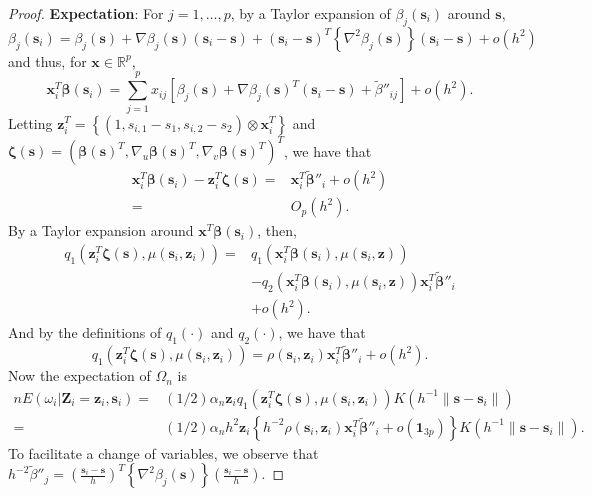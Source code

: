 \documentclass[authoryear,review, 12pt]{elsarticle}
\begin{document}
\begin{proof}
\textbf{Expectation}: For $j=1,\dots,p$, by a Taylor expansion of
$\beta_{j}(\bm{s}_{i})$ around $\bm{s}$,
\[
\beta_{j}(\bm{s}_{i})=\beta_{j}(\bm{s})+\nabla\beta_{j}(\bm{s})(\bm{s}_{i}-\bm{s})+(\bm{s}_{i}-\bm{s})^{T}\left\{ \nabla^{2}\beta_{j}(\bm{s})\right\} (\bm{s}_{i}-\bm{s})+o\left(h^{2}\right)
\]
and thus, for $\bm{x}\in\mathbb{R}^{p}$, 
\[
\bm{x}_{i}^{T}\bm{\beta}\!\left(\bm{s}_{i}\right)=\sum_{j=1}^{p}x_{ij}\left[\beta_{j}(\bm{s})+\nabla\beta_{j}(\bm{s})^{T}(\bm{s}_{i}-\bm{s})+\tilde{\beta}''_{ij}\right]+o\left(h^{2}\right).
\]
Letting $\bm{z}_{i}^{T}=\left\{ \left(1,s_{i,1}-s_{1},s_{i,2}-s_{2}\right)\otimes\bm{x}_{i}^{T}\right\} $
and $\bm{\zeta}(\bm{s})=\left(\bm{\beta}(\bm{s})^{T},\nabla_{u}\bm{\beta}(\bm{s})^{T},\nabla_{v}\bm{\beta}(\bm{s})^{T}\right)^{T}$,
we have that 
\begin{align*}
\bm{x}_{i}^{T}\bm{\beta}(\bm{s}_{i})-\bm{z}_{i}^{T}\bm{\zeta}(\bm{s})= & \bm{x}_{i}^{T}\tilde{\bm{\beta}}''_{i}+o\left(h^{2}\right)\\
= & O_{p}\left(h^{2}\right).
\end{align*}
By a Taylor expansion around $\bm{x}^{T}\bm{\beta}(\bm{s}_{i})$,
then, 
\begin{align*}
q_{1}\left(\bm{z}_{i}^{T}\bm{\zeta}(\bm{s}),\mu(\bm{s}_{i},\bm{z}_{i})\right)= & q_{1}\left(\bm{x}_{i}^{T}\bm{\beta}(\bm{s}_{i}),\mu(\bm{s}_{i},\bm{z})\right)\\
 & -q_{2}\left(\bm{x}_{i}^{T}\bm{\beta}(\bm{s}_{i}),\mu(\bm{s}_{i},\bm{z})\right)\bm{x}_{i}^{T}\tilde{\bm{\beta}}''_{i}\\
 & +o\left(h^{2}\right).
\end{align*}
And by the definitions of $q_{1}(\cdot)$ and $q_{2}(\cdot)$, we
have that
\[
q_{1}\left(\bm{z}_{i}^{T}\bm{\zeta}(\bm{s}),\mu(\bm{s}_{i},\bm{z}_{i})\right)=\rho(\bm{s}_{i},\bm{z}_{i})\bm{x}_{i}^{T}\tilde{\bm{\beta}}''_{i}+o\left(h^{2}\right).
\]
Now the expectation of $\Omega_{n}$ is 
\begin{align*}
nE\left(\omega_{i}|\bm{Z}_{i}=\bm{z}_{i},\bm{s}_{i}\right)= & \left(1/2\right)\alpha_{n}\bm{z}_{i}q_{1}\left(\bm{z}_{i}^{T}\bm{\zeta}(\bm{s}),\mu(\bm{s}_{i},\bm{z}_{i})\right)K\left(h^{-1}\|\bm{s}-\bm{s}_{i}\|\right)\\
= & \left(1/2\right)\alpha_{n}h^{2}\bm{z}_{i}\left\{ h^{-2}\rho(\bm{s}_{i},\bm{z}_{i})\bm{x}_{i}^{T}\tilde{\bm{\beta}}''_{i}+o\left(\bm{1}_{3p}\right)\right\} K\left(h^{-1}\|\bm{s}-\bm{s}_{i}\|\right).
\end{align*}
To facilitate a change of variables, we observe that $h^{-2}\tilde{\beta}''_{j}=\left(\frac{\bm{s}_{i}-\bm{s}}{h}\right)^{T}\left\{ \nabla^{2}\beta_{j}(\bm{s})\right\} \left(\frac{\bm{s}_{i}-\bm{s}}{h}\right)$.

\end{proof}
\end{document}
